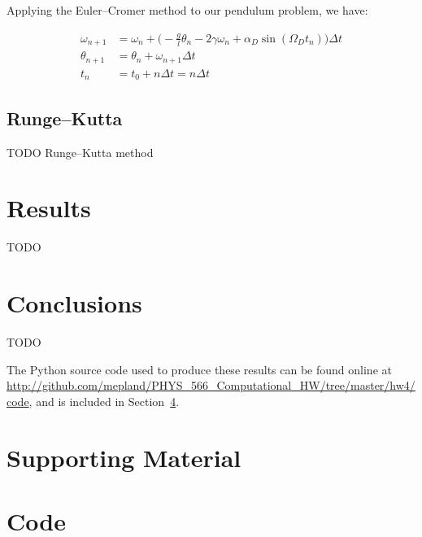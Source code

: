 \documentclass[notitlepage,aps,prd,nofootinbib]{revtex4-1}
\begin{document}
Applying the Euler--Cromer method to our pendulum problem, we have:

\begin{align} \label{eq:euler_chromer_applied}
\omega_{n+1} &= \omega_{n} + \bigg( -\frac{g}{l}\theta_{n} - 2\gamma \omega_{n} + \alpha_{D}\sin\left(\Omega_{D} t_{n}\right) \bigg) \Delta t \\
\theta_{n+1} &= \theta_{n} + \omega_{n+1} \Delta t \\
t_{n} &= t_{0} + n \Delta t = n \Delta t
\end{align}


\subsection{Runge--Kutta}
\label{subsec:runge_kutta}
TODO
Runge--Kutta method


\clearpage
\section{Results}
\label{sec:results}
TODO


\begin{comment}
\begin{figure}[!htbc]
  \centering
  \texttt{[image: ]}
	{\par\nobreak\rule[9pt]{35em}{0.5pt}\vspace{-5mm}}
	\caption{}
	\label{fig:}
\end{figure}
\end{comment}

\section{Conclusions}
\label{sec:Conclusions}
TODO

The Python source code used to produce these results can be found online at \url{http://github.com/mepland/PHYS_566_Computational_HW/tree/master/hw4/code}, and is included in Section~\ref{sec:code}.

\clearpage
\section{Supporting Material}
\label{sec:Supporting_Material}


\clearpage


\clearpage
\section{Code}
\label{sec:code}


\end{document}
